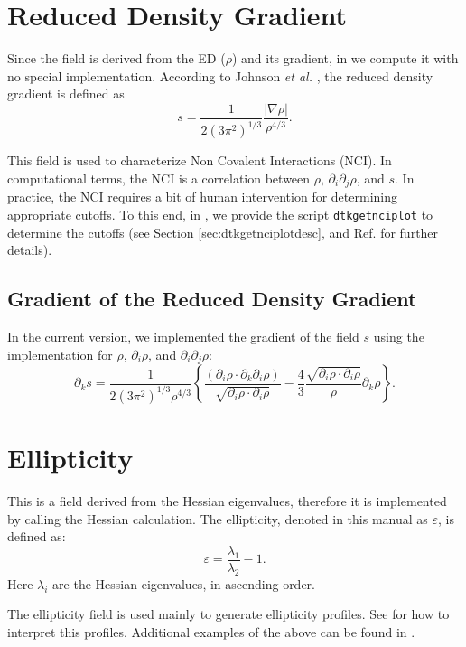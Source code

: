 \section{Reduced Density Gradient}
Since the field is derived from the ED ($\rho$) and its gradient, in \DTK{} we
compute it with no special implementation. According to Johnson \textit{et al.} \cite{bib:johnson2010}, the
reduced density gradient is defined as
%
\begin{equation}%
  s=\frac{1}{2(3\pi^2)^{1/3}}\frac{|\nabla\rho|}{\rho^{4/3}}.
\end{equation}
%

This field is used to characterize Non Covalent Interactions (NCI). In computational terms, the
NCI is a correlation between $\rho$, $\partial_i\partial_j\rho$, and $s$. In practice,
the NCI requires a bit of human intervention for determining appropriate cutoffs.
To this end, in \DTK, we provide the script \texttt{dtkgetnciplot} to determine
the cutoffs (see Section \ref{sec:dtkgetnciplotdesc}, and Ref. \cite{bib:contreras2011}
for further details).
\subsection{Gradient of the Reduced Density Gradient}
In the current version, we implemented the gradient of the field $s$ using the implementation
for $\rho$, $\partial_i\rho$, and $\partial_i\partial_j\rho$:
\begin{equation}
	\partial_ks=\frac{1}{2(3\pi^2)^{1/3}\rho^{4/3}}\left\{
		\frac{\left(\partial_i\rho\cdot\partial_k\partial_i\rho\right)}{\sqrt{\partial_i\rho\cdot\partial_i\rho}}
		-\frac{4}{3}\frac{\sqrt{\partial_i\rho\cdot\partial_i\rho}}{\rho}\partial_k\rho
	\right\}.
\end{equation}

\section{Ellipticity}
This is a field derived from the Hessian eigenvalues, therefore it is implemented
by calling the Hessian calculation. The ellipticity, denoted in this manual as
$\varepsilon$, is defined as:
\begin{equation}
   \varepsilon=\frac{\lambda_1}{\lambda_2}-1.
\end{equation}
Here $\lambda_i$ are the Hessian eigenvalues, in ascending order.

The ellipticity field is used mainly to generate ellipticity profiles. See 
\cite{bib:cheeseman1988} for how to interpret this profiles. Additional
examples of the above can be found in \cite{bib:tafipolsky2002}.
